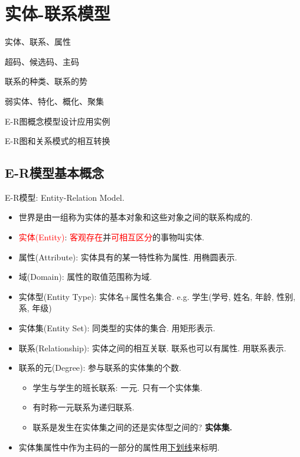 \chapter{实体-联系模型}

\begin{introduction}[期末考试提纲]
    \item 实体、联系、属性
    \item 超码、候选码、主码
    \item 联系的种类、联系的势
    \item 弱实体、特化、概化、聚集
    \item E-R图概念模型设计应用实例
    \item E-R图和关系模式的相互转换
\end{introduction}

\section{E-R模型基本概念}

E-R模型: Entity-Relation Model.
\begin{itemize}
    \item 世界是由一组称为实体的基本对象和这些对象之间的联系构成的.
    \item \textcolor{red}{实体(Entity)}: \textcolor{red}{客观存在}并\textcolor{red}{可相互区分}的事物叫实体.
    \item 属性(Attribute): 实体具有的某一特性称为属性. 用椭圆表示.
    \item 域(Domain): 属性的取值范围称为域.
    \item 实体型(Entity Type): 实体名+属性名集合. e.g. 学生(学号, 姓名, 年龄, 性别, 系, 年级)
    \item 实体集(Entity Set): 同类型的实体的集合. 用矩形表示.
    \item 联系(Relationship): 实体之间的相互关联. 联系也可以有属性. 用联系表示.
    \item 联系的元(Degree): 参与联系的实体集的个数.
    \begin{itemize}
        \item 学生与学生的班长联系: 一元. 只有一个实体集.
        \item 有时称一元联系为递归联系.
        \item 联系是发生在实体集之间的还是实体型之间的? \textbf{实体集.}
    \end{itemize}
    \item 实体集属性中作为主码的一部分的属性用\underline{下划线}来标明.
\end{itemize}


